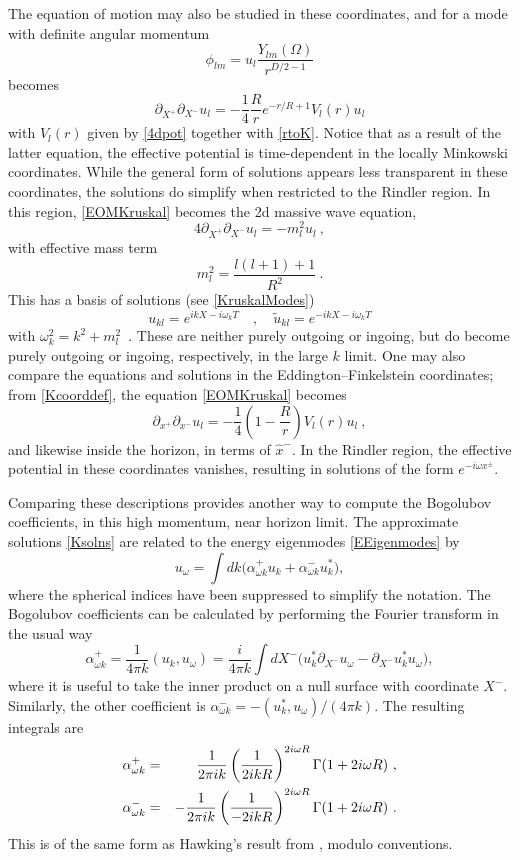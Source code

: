 \documentclass[11pt]{article}
\numberwithin{equation}{section}
\newcommand{\beq}{\begin{equation}}
\newcommand{\eeq}{\end{equation}}
\newcommand{\bea}{\begin{eqnarray}}
\newcommand{\eea}{\end{eqnarray}}
\begin{document}
The equation of motion may also be studied in these coordinates, and for a mode with definite angular momentum 
\beq
\phi_{lm} = u_l \frac{Y_{lm}(\Omega)}{r^{D/2-1}}
\eeq
becomes
\beq\label{EOMKruskal}
\partial_{X^+}\partial_{X^-}u_l = -\frac{1}{4} \frac{R}{r} e^{-r/R+1} V_l(r)u_l
\eeq
with $V_l(r)$ given by \eqref{4dpot} together with \eqref{rtoK}.  Notice that as a result of the latter equation, the effective potential is time-dependent in the locally Minkowski coordinates.  While the general form of solutions appears less transparent in these coordinates, the solutions do simplify when restricted to the Rindler region.  In this region, \eqref{EOMKruskal} becomes the 2d massive wave equation,
\beq
4\partial_{X^+}\partial_{X^-}u_l = -m_l^2 u_l\ ,
\eeq
with effective mass term
\beq
m_l^2=\frac{l(l+1)+1}{ R^2}\ .
\eeq
This has a basis of solutions (see \eqref{KruskalModes})
\beq\label{Ksolns}
u_{kl}= e^{ikX-i\omega_k T}\quad , \quad \tilde u_{kl}= e^{-ikX-i\omega_k T}
\eeq
with $\omega_k^2=k^2+m_l^2$\ .
These are neither purely outgoing or ingoing, but do become purely outgoing or ingoing, respectively, in the large $k$ limit.  
One may also compare the equations and solutions in the Eddington--Finkelstein coordinates; from \eqref{Kcoorddef}, 
the equation \eqref{EOMKruskal} becomes
\beq
\partial_{x^+}\partial_{x^-}u_l = -\frac{1}{4}\left(1-\frac{R}{r}\right) V_l(r) u_l\ ,
\eeq
and likewise inside the horizon, in terms of $\hat x^-$.  In the Rindler region, the effective potential in these coordinates vanishes, resulting in solutions of the form $e^{-i\omega x^\pm}$.

Comparing these descriptions provides another way to compute the Bogolubov coefficients, in this high momentum, near horizon limit. The approximate solutions \eqref{Ksolns} are related to the energy eigenmodes \eqref{EEigenmodes} by
\beq
u_{\omega}= \int dk \big( \alpha^+_{\omega k} u_{k}+\alpha^-_{\omega k}u_{k}^*\big) ,
\eeq
where the spherical indices have been suppressed to simplify the notation. The Bogolubov coefficients can be calculated by performing the Fourier transform in the usual way
\beq
\alpha^+_{\omega k}=\frac{1}{4\pi k} (u_k,u_\omega) = \frac{i}{4\pi k} \int dX^- \big(u_{k}^*\partial_{X^-}u_\omega - \partial_{X^-}u_{k}^* u_\omega \big),
\eeq
where it is useful to take the inner product on a null surface with coordinate $X^-$. Similarly, the other coefficient is $\alpha^-_{\omega k}=-(u_k^*,u_\omega)/(4\pi k)$. The resulting integrals are
\bea
\alpha^+_{\omega k}&=&\frac{1}{2\pi i k} \left(\frac{1}{2ikR}\right)^{2i\omega R}\Gamma(1+2 i \omega R)\ ,\cr
\alpha^-_{\omega k}&=&-\frac{1}{2\pi i k}\left(\frac{1}{-2ikR}\right)^{2i\omega R}\Gamma(1+2 i \omega R)\ .
\eea 
This is of the same form as  Hawking's result from \cite{Hawk}, modulo conventions.




{}
\end{document}
